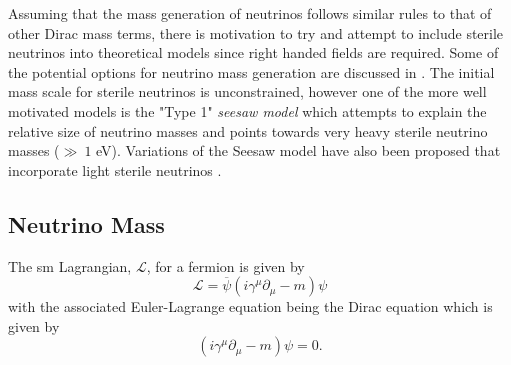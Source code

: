 Assuming that the mass generation of neutrinos follows similar rules to that of other Dirac mass terms, there is motivation to try and attempt to include sterile neutrinos into theoretical models since right handed fields are required. Some of the potential options for neutrino mass generation are discussed in . The initial mass scale for sterile neutrinos is unconstrained, however one of the more well motivated models is the "Type 1" \textit{seesaw model} which attempts to explain the relative size of neutrino masses and points towards very heavy sterile neutrino masses ($\gg ~1$ eV). Variations of the Seesaw model have also been proposed that incorporate light sterile neutrinos \cite{White_Paper}.

\subsection{Neutrino Mass}\label{subsec:Neutrino Mass}
The \gls{sm} Lagrangian, $\mathcal{L}$, for a fermion is given by
\begin{equation}\label{eqn:SM Lagrangian}
    \mathcal{L} = \overline{\psi}(i\gamma^{\mu} \partial_{\mu} - m)\psi
\end{equation}
with the associated Euler-Lagrange equation being the Dirac equation which is given by \cite{Fundamentals_of_Neutrino_Physics_and_Astrophysics}
\begin{equation}
    (i\gamma^\mu\partial_\mu - m)\psi = 0.
\end{equation}
